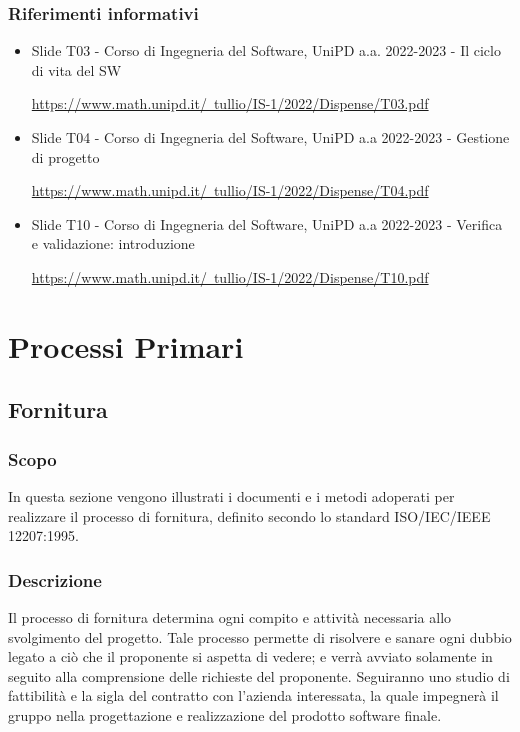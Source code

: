 \subsubsection{Riferimenti informativi}
\begin{itemize}
\item Slide T03 - Corso di Ingegneria del Software, UniPD a.a. 2022-2023 - Il ciclo di vita del SW

\href{https://www.math.unipd.it/~tullio/IS-1/2022/Dispense/T03.pdf}{https://www.math.unipd.it/~tullio/IS-1/2022/Dispense/T03.pdf}
\item Slide T04 - Corso di Ingegneria del Software, UniPD a.a 2022-2023 - Gestione di progetto

\href{https://www.math.unipd.it/~tullio/IS-1/2022/Dispense/T04.pdf}{https://www.math.unipd.it/~tullio/IS-1/2022/Dispense/T04.pdf}
\item Slide T10 - Corso di Ingegneria del Software, UniPD a.a 2022-2023 - Verifica e validazione: introduzione

\href{https://www.math.unipd.it/~tullio/IS-1/2022/Dispense/T10.pdf}{https://www.math.unipd.it/~tullio/IS-1/2022/Dispense/T10.pdf}
\end{itemize}

\pagebreak

\section{Processi Primari}
\subsection{Fornitura}

\subsubsection{Scopo}
In questa sezione vengono illustrati i documenti e i metodi adoperati per realizzare il processo\glo{} di fornitura, definito secondo lo standard ISO/IEC/IEEE 12207:1995.

\subsubsection{Descrizione}
Il processo di fornitura determina ogni compito e attività necessaria allo svolgimento del progetto. Tale processo permette di risolvere e sanare ogni dubbio legato a ciò che il proponente\glo{} si aspetta di vedere; e verrà avviato solamente in seguito alla comprensione delle richieste del proponente. Seguiranno uno studio di fattibilità e la sigla del contratto con l'azienda interessata, la quale impegnerà il gruppo nella progettazione e realizzazione del prodotto software finale.

